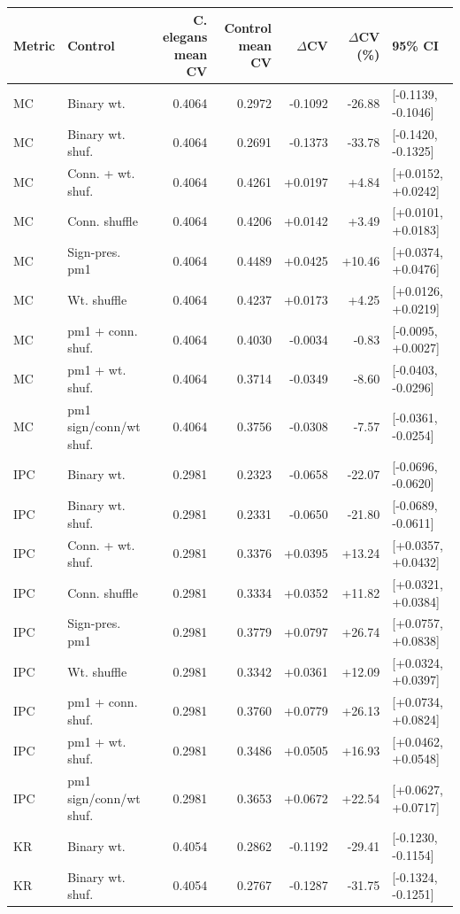 \begin{tabular}{llrrrrl}
\toprule
Metric & Control & C. elegans mean CV & Control mean CV & $\Delta$CV & $\Delta$CV (\%) & 95\% CI \\
\midrule
MC & Binary wt. & 0.4064 & 0.2972 & -0.1092 & -26.88 & [-0.1139, -0.1046] \\
MC & Binary wt. shuf. & 0.4064 & 0.2691 & -0.1373 & -33.78 & [-0.1420, -0.1325] \\
MC & Conn. + wt. shuf. & 0.4064 & 0.4261 & +0.0197 & +4.84 & [+0.0152, +0.0242] \\
MC & Conn. shuffle & 0.4064 & 0.4206 & +0.0142 & +3.49 & [+0.0101, +0.0183] \\
MC & Sign-pres. pm1 & 0.4064 & 0.4489 & +0.0425 & +10.46 & [+0.0374, +0.0476] \\
MC & Wt. shuffle & 0.4064 & 0.4237 & +0.0173 & +4.25 & [+0.0126, +0.0219] \\
MC & pm1 + conn. shuf. & 0.4064 & 0.4030 & -0.0034 & -0.83 & [-0.0095, +0.0027] \\
MC & pm1 + wt. shuf. & 0.4064 & 0.3714 & -0.0349 & -8.60 & [-0.0403, -0.0296] \\
MC & pm1 sign/conn/wt shuf. & 0.4064 & 0.3756 & -0.0308 & -7.57 & [-0.0361, -0.0254] \\
IPC & Binary wt. & 0.2981 & 0.2323 & -0.0658 & -22.07 & [-0.0696, -0.0620] \\
IPC & Binary wt. shuf. & 0.2981 & 0.2331 & -0.0650 & -21.80 & [-0.0689, -0.0611] \\
IPC & Conn. + wt. shuf. & 0.2981 & 0.3376 & +0.0395 & +13.24 & [+0.0357, +0.0432] \\
IPC & Conn. shuffle & 0.2981 & 0.3334 & +0.0352 & +11.82 & [+0.0321, +0.0384] \\
IPC & Sign-pres. pm1 & 0.2981 & 0.3779 & +0.0797 & +26.74 & [+0.0757, +0.0838] \\
IPC & Wt. shuffle & 0.2981 & 0.3342 & +0.0361 & +12.09 & [+0.0324, +0.0397] \\
IPC & pm1 + conn. shuf. & 0.2981 & 0.3760 & +0.0779 & +26.13 & [+0.0734, +0.0824] \\
IPC & pm1 + wt. shuf. & 0.2981 & 0.3486 & +0.0505 & +16.93 & [+0.0462, +0.0548] \\
IPC & pm1 sign/conn/wt shuf. & 0.2981 & 0.3653 & +0.0672 & +22.54 & [+0.0627, +0.0717] \\
KR & Binary wt. & 0.4054 & 0.2862 & -0.1192 & -29.41 & [-0.1230, -0.1154] \\
KR & Binary wt. shuf. & 0.4054 & 0.2767 & -0.1287 & -31.75 & [-0.1324, -0.1251] \\

\end{tabular}
